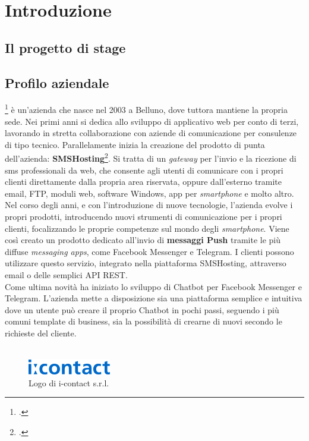 
\chapter{Introduzione}
\label{cap:contesto-aziendale}
\section{Il progetto di stage}



\section{Profilo aziendale}
\azienda\footcite{icontact} è un'azienda che nasce nel 2003 a Belluno, dove tuttora mantiene la propria sede. Nei primi anni si dedica allo sviluppo di applicativo web per conto di terzi, lavorando in stretta collaborazione con aziende di comunicazione per consulenze di tipo tecnico. Parallelamente inizia la creazione del prodotto di punta dell'azienda: \textbf{SMSHosting}\footcite{smshosting}. Si tratta di un \emph{gateway} per l'invio e la ricezione di sms professionali da web, che consente agli utenti di comunicare con i propri clienti direttamente dalla propria area riservata, oppure dall'esterno tramite email, \gls{FTP}, moduli web, software Windows, app per \emph{smartphone} e molto altro.  \\
Nel corso degli anni, e con l'introduzione di nuove tecnologie, l'azienda evolve i propri prodotti, introducendo nuovi strumenti di comunicazione per i propri clienti, focalizzando le proprie competenze sul mondo degli \emph{smartphone}.
Viene così creato un prodotto dedicato all'invio di \textbf{messaggi \gls{Push}} tramite le più diffuse \emph{messaging apps}, come Facebook Messenger e Telegram. I clienti possono utilizzare questo servizio, integrato nella piattaforma SMSHosting, attraverso email o delle semplici \gls{API} REST.\\
Come ultima novità \azienda{} ha iniziato lo sviluppo di \gls{Chatbot} per Facebook Messenger e Telegram. L'azienda mette a disposizione sia una piattaforma semplice e intuitiva dove un utente può creare il proprio \gls{Chatbot} in pochi passi, seguendo i più comuni template di business, sia la possibilità di crearne di nuovi secondo le richieste del cliente.
\\ \\
\begin{figure}[h]
	\centering
	\includegraphics[scale=1]{../Immagini/logo-icontact.png}
	\caption{Logo di i-contact s.r.l.}
\end{figure}
\newpage
